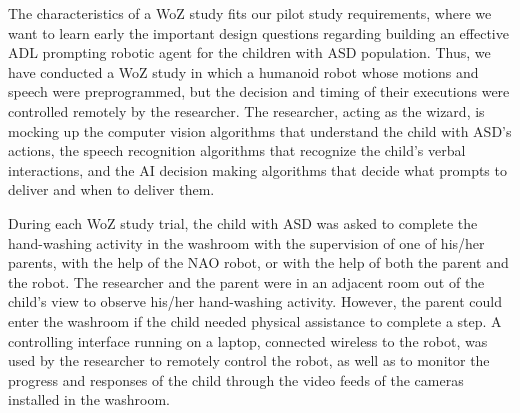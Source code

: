 The characteristics of a WoZ study fits our pilot study requirements, where we want to learn early the important design questions regarding building an effective ADL prompting robotic agent for the children with ASD population.  Thus, we have conducted a WoZ study in which a humanoid robot whose motions and speech were preprogrammed, but the decision and timing of their executions were controlled remotely by the researcher.  The researcher, acting as the wizard, is mocking up the computer vision algorithms that understand the child with ASD's actions, the speech recognition algorithms that recognize the child's verbal interactions, and the AI decision making algorithms that decide what prompts to deliver and when to deliver them.

During each WoZ study trial, the child with ASD was asked to complete the hand-washing activity in the washroom with the supervision of one of his/her parents, with the help of the NAO robot, or with the help of both the parent and the robot. The researcher and the parent were in an adjacent room out of the child's view to observe his/her hand-washing activity.  However, the parent could enter the washroom if the child needed physical assistance to complete a step. A controlling interface running on a laptop, connected wireless to the robot, was used by the researcher to remotely control the robot, as well as to monitor the progress and responses of the child through the video feeds of the cameras installed in the washroom.

